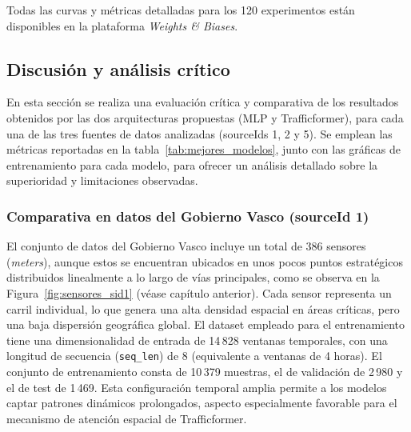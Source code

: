 Todas las curvas y métricas detalladas para los 120 experimentos están disponibles en la plataforma \textit{Weights \& Biases}.


\subsection{Discusión y análisis crítico}
\label{sec:discusion_analisis}

En esta sección se realiza una evaluación crítica y comparativa de los resultados obtenidos por las dos arquitecturas propuestas (MLP y Trafficformer), para cada una de las tres fuentes de datos analizadas (sourceIds 1, 2 y 5). Se emplean las métricas reportadas en la tabla~\ref{tab:mejores_modelos}, junto con las gráficas de entrenamiento para cada modelo, para ofrecer un análisis detallado sobre la superioridad y limitaciones observadas.

\subsubsection*{Comparativa en datos del Gobierno Vasco (sourceId 1)}

El conjunto de datos del Gobierno Vasco incluye un total de 386 sensores (\textit{meters}), aunque estos se encuentran ubicados en unos pocos puntos estratégicos distribuidos linealmente a lo largo de vías principales, como se observa en la Figura~\ref{fig:sensores_sid1} (véase capítulo anterior). Cada sensor representa un carril individual, lo que genera una alta densidad espacial en áreas críticas, pero una baja dispersión geográfica global. El dataset empleado para el entrenamiento tiene una dimensionalidad de entrada de 14\,828 ventanas temporales, con una longitud de secuencia (\texttt{seq\_len}) de 8 (equivalente a ventanas de 4 horas). El conjunto de entrenamiento consta de 10\,379 muestras, el de validación de 2\,980 y el de test de 1\,469. Esta configuración temporal amplia permite a los modelos captar patrones dinámicos prolongados, aspecto especialmente favorable para el mecanismo de atención espacial de Trafficformer.

